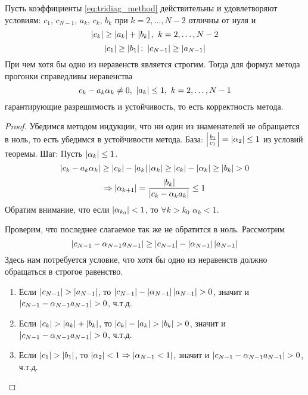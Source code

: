 \begin{theorem}
  Пусть коэффициенты \eqref{eq:tridiag_method} действительны и удовлетворяют
  условиям: $c_1$, $c_{N-1}$, $a_k$, $c_k$, $b_k$ при $k=2,\ldots,N-2$
  отличны от нуля и
  \[\abs{c_k}\geq\abs{a_k}+\abs{b_k},\ k=2,\ldots,N-2\]
  \[\abs{c_1}\geq\abs{b_1};\ \abs{c_{N-1}}\geq\abs{a_{N-1}}\]
  При чем хотя бы одно из неравенств является строгим. Тогда
  для формул метода прогонки справедливы неравенства
  \[c_k-a_k\alpha_k\neq0,\ \abs{a_k}\leq1,\ k=2,\ldots,N-1\]
  гарантирующие разрешимость и устойчивость, то есть корректность метода.
\end{theorem}
\begin{proof}
  Убедимся методом индукции, что ни один из знаменателей не обращается в ноль,
  то есть убедимся в устойчивости метода.
  База: $\left\lvert\frac{b_1}{c_1}\right\rvert=\left\lvert\alpha_2\right\rvert\leq1$ из условий теоремы.
  Шаг: Пусть $\left\lvert\alpha_k\right\rvert\leq1$.
  \[\left\lvert c_k-a_k\alpha_k\right\rvert\geq\left\lvert c_k\right\rvert-\left\lvert a_k\right\rvert\left\lvert\alpha_k\right\rvert\geq\left\lvert c_k\right\rvert-\left\lvert\alpha_k\right\rvert\geq\left\lvert b_k\right\rvert>0\]
  \[\Rightarrow\left\lvert\alpha_{k+1}\right\rvert=\frac{\left\lvert b_k\right\rvert}{\left\lvert c_k-\alpha_ka_k\right\rvert}\leq1\]
  Обратим внимание, что если $\left\lvert\alpha_{k_0}\right\rvert<1$, то $\forall k>k_0$ $\alpha_k<1$.

  Проверим, что последнее слагаемое так же не обратится в ноль. Рассмотрим
  \[\left\lvert c_{N-1}-\alpha_{N-1}a_{N-1}\right\rvert\geq\left\lvert c_{N-1}\right\rvert-\left\lvert\alpha_{N-1}\right\rvert\left\lvert a_{N-1}\right\rvert\]
  Здесь нам потребуется условие, что хотя бы одно из неравенств должно обращаться в строгое равенство.
  \begin{enumerate}
    \item Если $\left\lvert c_{N-1}\right\rvert>\left\lvert a_{N-1}\right\rvert$, то $\left\lvert c_{N-1}\right\rvert-\left\lvert\alpha_{N-1}\right\rvert\left\lvert a_{N-1}\right\rvert>0$, значит и $\left\lvert c_{N-1}-\alpha_{N-1}a_{N-1}\right\rvert>0$, ч.т.д.
    \item Если $\left\lvert c_k\right\rvert>\left\lvert a_k\right\rvert+\left\lvert b_k\right\rvert$, то $\left\lvert c_k\right\rvert-\left\lvert a_k\right\rvert>\left\lvert b_k\right\rvert>0$, значит и $\left\lvert c_{N-1}-\alpha_{N-1}a_{N-1}\right\rvert>0$, ч.т.д.
    \item Если $\left\lvert c_1\right\rvert>\left\lvert b_1\right\rvert$, то $\left\lvert\alpha_2\right\rvert<1\Rightarrow\left\lvert\alpha_{N-1}<1\right\rvert$, значит и $\left\lvert c_{N-1}-\alpha_{N-1}a_{N-1}\right\rvert>0$, ч.т.д.
  \end{enumerate}
\end{proof}

